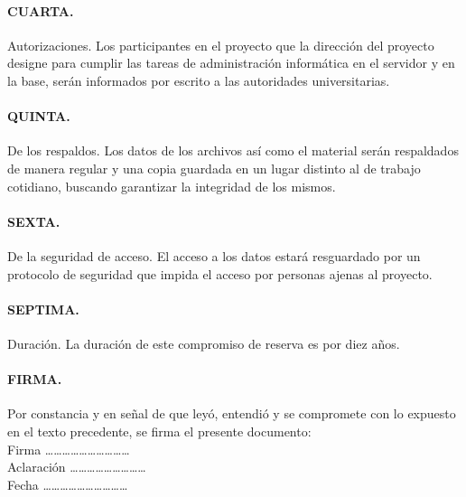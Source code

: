 \documentclass{article}
\begin{document}
\paragraph{CUARTA.} Autorizaciones. Los participantes en el proyecto que la dirección del proyecto designe para cumplir las tareas de administración informática en el servidor y en la base, serán informados por escrito a las autoridades universitarias.\\

\paragraph{QUINTA.} De los respaldos. Los datos de los archivos así como el material serán respaldados de manera regular y una copia guardada en un lugar distinto al de trabajo cotidiano, buscando garantizar la integridad de los mismos.\\

\paragraph{SEXTA.} De la seguridad de acceso. El acceso a los datos estará resguardado por un protocolo de seguridad que impida el acceso por personas ajenas al proyecto.\\

\paragraph{SEPTIMA.} Duración. La duración de este compromiso de reserva es por diez años.\\

\paragraph{FIRMA.} Por constancia y en señal de que leyó, entendió y se compromete con lo expuesto en el texto precedente, se firma el presente documento:\\[5ex]

\noindent Firma \ldots\ldots\ldots\ldots\ldots\ldots\ldots\ldots\ldots\ldots\\[4ex]
\noindent Aclaración \ldots\ldots\ldots\ldots\ldots\ldots\ldots\ldots\ldots\\[4ex]
\noindent Fecha \ldots\ldots\ldots\ldots\ldots\ldots\ldots\ldots\ldots\ldots
\end{document}
